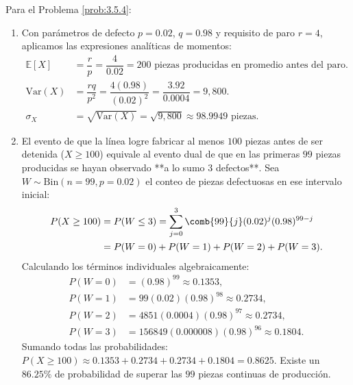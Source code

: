 \begin{solucion}
	\label{sol:3.5.4}
	Para el Problema \ref{prob:3.5.4}:
	\begin{enumerate}
		\item Con parámetros de defecto $p = 0.02$, $q = 0.98$ y requisito de paro $r = 4$, aplicamos las expresiones analíticas de momentos:
		\begin{align*}
			\mathbb{E}[X] &= \dfrac{r}{p} = \dfrac{4}{0.02} = 200 \text{ piezas producidas en promedio antes del paro.} \\
			\text{Var}(X) &= \dfrac{rq}{p^2} = \dfrac{4(0.98)}{(0.02)^2} = \dfrac{3.92}{0.0004} = 9,800. \\
			\sigma_X &= \sqrt{\text{Var}(X)} = \sqrt{9,800} \approx 98.9949 \text{ piezas.}
		\end{align*}
		\item El evento de que la línea logre fabricar al menos $100$ piezas antes de ser detenida ($X \ge 100$) equivale al evento dual de que en las primeras $99$ piezas producidas se hayan observado **a lo sumo $3$ defectos**. Sea $W \sim \text{Bin}(n=99, p=0.02)$ el conteo de piezas defectuosas en ese intervalo inicial:
		\begin{align*}
			P(X \ge 100) &= P(W \le 3) = \sum_{j=0}^3 \comb{99}{j} (0.02)^j (0.98)^{99-j} \\
			&= P(W=0) + P(W=1) + P(W=2) + P(W=3).
		\end{align*}
		Calculando los términos individuales algebraicamente:
		\begin{align*}
			P(W=0) &= (0.98)^{99} \approx 0.1353, \\
			P(W=1) &= 99(0.02)(0.98)^{98} \approx 0.2734, \\
			P(W=2) &= 4851(0.0004)(0.98)^{97} \approx 0.2734, \\
			P(W=3) &= 156849(0.000008)(0.98)^{96} \approx 0.1804.
		\end{align*}
		Sumando todas las probabilidades: $P(X \ge 100) \approx 0.1353 + 0.2734 + 0.2734 + 0.1804 = 0.8625$. Existe un $86.25\%$ de probabilidad de superar las $99$ piezas continuas de producción.
	\end{enumerate}
\end{solucion}

